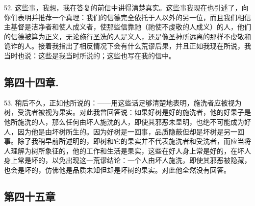 52. 这些事，我想，我在答复的前信中讲得清楚真实。这些事我现在也引述了，向你们表明并推荐一个真理：我们的信德完全依托于人以外的另一位，而且我们相信主基督是洁净者和使人成义者，使那些信靠祂（祂使不虔敬的人成义）的人，他们的信德被算为正义，无论施行圣洗的人是义人，还是像圣神所远离的那样不虔敬和诡诈的人。接着我指出了相反情况下会有什么荒谬后果，并且正如我现在所说，我当时也说：这些是我当时所说的；这些也写在我的信中。\par


\subsection{第四十四章.}

53. 稍后不久，正如他所说的：——用这些话足够清楚地表明，施洗者应被视为树，受洗者被视为果实。对此我曾回答说：如果好树是好的施洗者，他的好果子是他所施洗的人，那么任何由坏人施洗的人，即使其邪恶未显明，也绝不可能成为好人，因为他是由坏树所生的。因为好树是一回事，品质隐蔽但却是坏树是另一回事。除了我稍早前所述明的，即树和它的果实并不代表施洗者和受洗者，而应当将人理解为树所象征的，他的工作和生活是果实，这些在好人身上常是好的，在坏人身上常是坏的，以免出现这一荒谬结论：一个人由坏人施洗，即使其邪恶被隐藏，也会是坏的，仿佛他是品质未知但却是坏树的果实。对此他全然没有回答。\par


\subsection{第四十五章}


